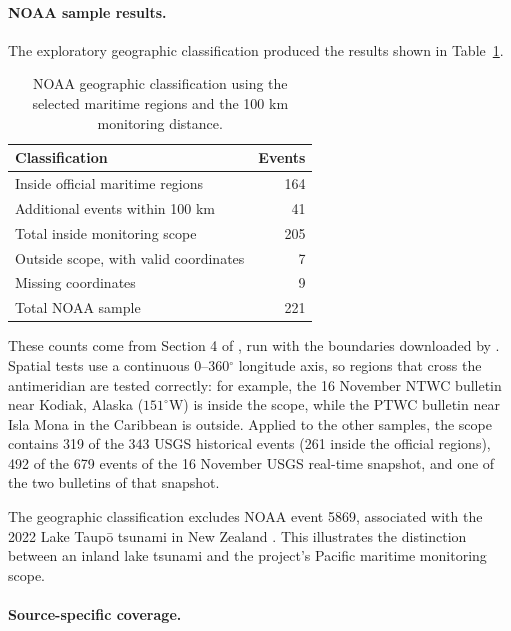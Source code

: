 \documentclass[a4paper,11pt,oneside]{book}
\begin{document}
\paragraph{NOAA sample results.}

The exploratory geographic classification produced the results
shown in Table~\ref{tab:pacific-scope}.

\begin{table}[H]
\centering
\begin{tabular}{lr}
\toprule
Classification & Events \\
\midrule
Inside official maritime regions & 164 \\
Additional events within 100 km & 41 \\
Total inside monitoring scope & 205 \\
Outside scope, with valid coordinates & 7 \\
Missing coordinates & 9 \\
\midrule
Total NOAA sample & 221 \\
\bottomrule
\end{tabular}
\caption{NOAA geographic classification using the selected
maritime regions and the 100 km monitoring distance.}
\label{tab:pacific-scope}
\end{table}

These counts come from Section 4 of , run with the boundaries downloaded by .
Spatial tests use a continuous 0--360$^\circ$ longitude axis, so regions that cross the antimeridian are tested correctly: for example, the 16 November NTWC bulletin near Kodiak, Alaska ($151^\circ$W) is inside the scope, while the PTWC bulletin near Isla Mona in the Caribbean is outside.
Applied to the other samples, the scope contains 319 of the 343 USGS historical events (261 inside the official regions), 492 of the 679 events of the 16 November USGS real-time snapshot, and one of the two bulletins of that snapshot.

The geographic classification excludes NOAA event 5869, associated
with the 2022 Lake Taup\={o} tsunami in New Zealand \cite{taupo}.
This illustrates the distinction between an inland lake tsunami
and the project's Pacific maritime monitoring scope.

\paragraph{Source-specific coverage.}
\end{document}
